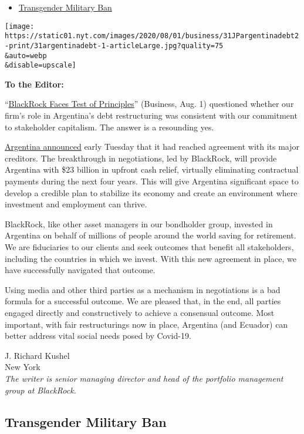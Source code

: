 \begin{itemize}
\tightlist
\item
  \protect\hyperlink{link-41dc3ccd}{Transgender Military Ban}
\end{itemize}

\texttt{[image: https://static01.nyt.com/images/2020/08/01/business/31JPargentinadebt2-print/31argentinadebt-1-articleLarge.jpg?quality=75\\\&auto=webp\\\&disable=upscale]}

\textbf{To the Editor:}

``\href{https://www.nytimes.com/2020/07/31/business/argentina-debt.html}{BlackRock
Faces Test of Principles}'' (Business, Aug. 1) questioned whether our
firm's role in Argentina's debt restructuring was consistent with our
commitment to stakeholder capitalism. The answer is a resounding yes.

\href{https://www.economia.gob.ar/en/argentina-and-three-creditor-groups-reach-a-deal-on-debt-restructuring/}{Argentina
announced} early Tuesday that it had reached agreement with its major
creditors. The breakthrough in negotiations, led by BlackRock, will
provide Argentina with \$23 billion in upfront cash relief, virtually
eliminating contractual payments during the next four years. This will
give Argentina significant space to develop a credible plan to stabilize
its economy and create an environment where investment and employment
can thrive.

BlackRock, like other asset managers in our bondholder group, invested
in Argentina on behalf of millions of people around the world saving for
retirement. We are fiduciaries to our clients and seek outcomes that
benefit all stakeholders, including the countries in which we invest.
With this new agreement in place, we have successfully navigated that
outcome.

Using media and other third parties as a mechanism in negotiations is a
bad formula for a successful outcome. We are pleased that, in the end,
all parties engaged directly and constructively to achieve a consensual
outcome. Most important, with fair restructurings now in place,
Argentina (and Ecuador) can better address vital social needs posed by
Covid-19.

J. Richard Kushel\\
New York\\
\emph{The writer is senior managing director and head of the portfolio
management group at BlackRock.}

\hypertarget{transgender-military-ban}{%
\subsection{Transgender Military Ban}\label{transgender-military-ban}}

